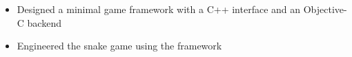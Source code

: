 
\begin{itemize}
  \item Designed a minimal game framework with a C++ interface and an
  Objective-C backend
  \item Engineered the snake game using the framework
\end{itemize}

